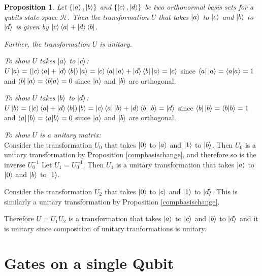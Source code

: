 \documentclass[12pt,twoside,fleqn]{report}
\makeatletter
\theoremstyle{thmstyle}
\renewenvironment{proof}[1][\proofname]{\par
\pushQED{\qed}%
\normalfont \topsep6\p@\@plus6\p@\relax
\trivlist
\item[\hskip\labelsep\itshape#1\@addpunct{.}]\mbox{}\par\nobreak\ignorespaces
}{%
    \popQED\endtrivlist\@endpefalse
    }
\newtheorem{prop}{Proposition}[chapter]
\makeatother
\begin{document}
\begin{prop}
    Let $\{ \ket{a}, \ket{b} \}$ and $\{ \ket{c}, \ket{d} \}$ be two orthonormal basis sets for a qubits state space $\mathcal{H}$. Then the transformation $U$ that takes $\ket{a}$ to $\ket{c}$ and $\ket{b}$ to $\ket{d}$ is given by $\ket{c}\bra{a} + \ket{d}\bra{b}$.

    Further, the transformation $U$ is unitary.
\end{prop}
\begin{proof}
    \emph{To show $U$ takes $\ket{a}$ to $\ket{c}$: }\\
    $U \ket{a} = (\ket{c}\bra{a} + \ket{d}\bra{b}) \ket{a} = \ket{c} \bra{a} \ket{a} + \ket{d} \bra{b} \ket{a} = \ket{c}$ since $\bra{a} \ket{a} = \braket{a|a} = 1$ and $\bra{b} \ket{a} = \braket{b|a} = 0$ since $\ket{a}$ and $\ket{b}$ are orthogonal.

    \emph{To show $U$ takes $\ket{b}$ to $\ket{d}$: } \\
    $U \ket{b} = (\ket{c}\bra{a} + \ket{d}\bra{b}) \ket{b} = \ket{c} \bra{a} \ket{b} + \ket{d} \bra{b} \ket{b} = \ket{d}$ since $\bra{b} \ket{b} = \braket{b|b} = 1$ and $\bra{a} \ket{b} = \braket{a|b} = 0$ since $\ket{a}$ and $\ket{b}$ are orthogonal.

    \emph{To show $U$ is a unitary matrix:} \\
    Consider the transformation $U_0$ that takes $\ket{0}$ to $\ket{a}$ and $\ket{1}$ to $\ket{b}$.
    Then $U_0$ is a unitary transformation by Proposition \ref{compbasischange}, and therefore so is the inverse $U_0^{-1}$
    Let $U_1 = U_0^{-1}$. Then $U_1$ is a unitary transformation that takes $\ket{a}$ to $\ket{0}$ and $\ket{b}$ to $\ket{1}$.

    Consider the transformation $U_2$ that takes $\ket{0}$ to $\ket{c}$ and $\ket{1}$ to $\ket{d}$. This is similarly a unitary transformation by Proposition \ref{compbasischange}.

    Therefore $U = U_1 U_2$ is a transformation that takes $\ket{a}$ to $\ket{c}$ and $\ket{b}$ to $\ket{d}$ and it is unitary since composition of unitary tranformations is unitary.
\end{proof}

\section{Gates on a single Qubit}
\end{document}
